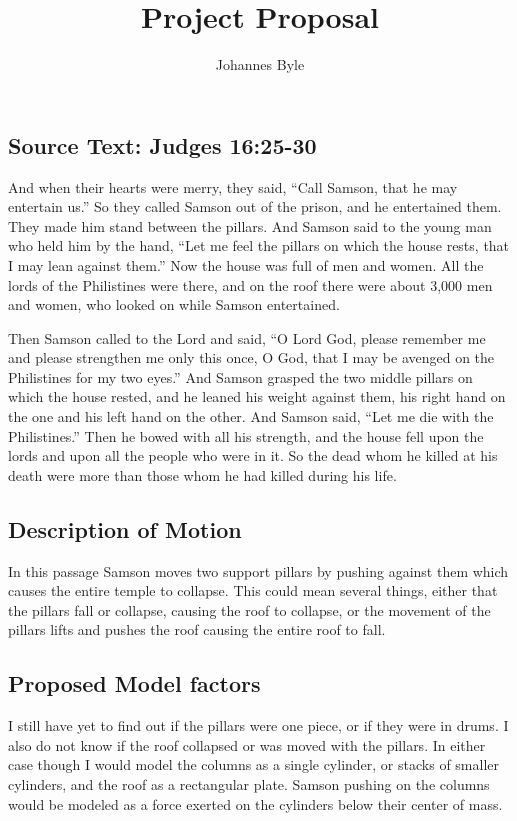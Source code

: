 \documentclass{article}
\begin{document}
\title{Project Proposal}
\author{Johannes Byle}
\maketitle
\subsection*{Source Text: Judges 16:25-30}
And when their hearts were merry, they said, “Call Samson, that he may entertain us.” So they called Samson out of the prison, and he entertained them. They made him stand between the pillars. And Samson said to the young man who held him by the hand, “Let me feel the pillars on which the house rests, that I may lean against them.” Now the house was full of men and women. All the lords of the Philistines were there, and on the roof there were about 3,000 men and women, who looked on while Samson entertained.

Then Samson called to the Lord and said, “O Lord God, please remember me and please strengthen me only this once, O God, that I may be avenged on the Philistines for my two eyes.” And Samson grasped the two middle pillars on which the house rested, and he leaned his weight against them, his right hand on the one and his left hand on the other. And Samson said, “Let me die with the Philistines.” Then he bowed with all his strength, and the house fell upon the lords and upon all the people who were in it. So the dead whom he killed at his death were more than those whom he had killed during his life.\\
\subsection*{Description of Motion}
In this passage Samson moves two support pillars by pushing against them which causes the entire temple to collapse. This could mean several things, either that the pillars fall or collapse, causing the roof to collapse, or the movement of the pillars lifts and pushes the roof causing the entire roof to fall.
\subsection*{Proposed Model factors}
I still have yet to find out if the pillars were one piece, or if they were in drums. I also do not know if the roof collapsed or was moved with the pillars. In either case though I would model the columns as a single cylinder, or stacks of smaller cylinders, and the roof as a rectangular plate. Samson pushing on the columns would be modeled as a force exerted on the cylinders below their center of mass. 
\end{document}
